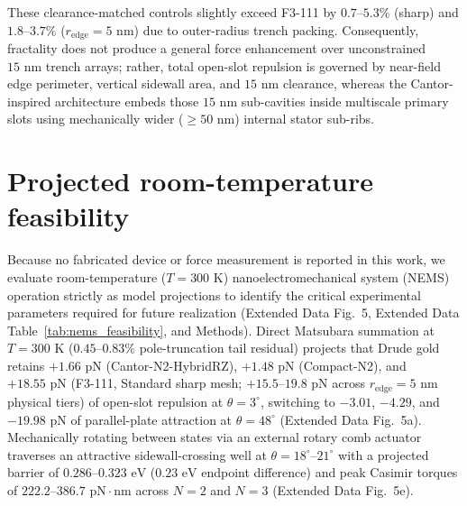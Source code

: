 \documentclass[11pt, a4paper]{article}
\begin{document}
These clearance-matched controls slightly exceed F3-111 by $0.7\text{--}5.3\%$ (sharp) and $1.8\text{--}3.7\%$ ($r_{\mathrm{edge}}=5\text{ nm}$) due to outer-radius trench packing. Consequently, fractality does not produce a general force enhancement over unconstrained $15\text{ nm}$ trench arrays; rather, total open-slot repulsion is governed by near-field edge perimeter, vertical sidewall area, and $15\text{ nm}$ clearance, whereas the Cantor-inspired architecture embeds those $15\text{ nm}$ sub-cavities inside multiscale primary slots using mechanically wider ($\ge 50\text{ nm}$) internal stator sub-ribs.

\section*{Projected room-temperature feasibility}

Because no fabricated device or force measurement is reported in this work, we evaluate room-temperature ($T = 300\text{ K}$) nanoelectromechanical system (NEMS) operation strictly as model projections to identify the critical experimental parameters required for future realization (Extended Data Fig.~5, Extended Data Table~\ref{tab:nems_feasibility}, and Methods). Direct Matsubara summation at $T = 300\text{ K}$ ($0.45\text{--}0.83\%$ pole-truncation tail residual) projects that Drude gold retains $+1.66\text{ pN}$ (Cantor-N2-HybridRZ), $+1.48\text{ pN}$ (Compact-N2), and $+18.55\text{ pN}$ (F3-111, Standard sharp mesh; $+15.5\text{--}19.8\text{ pN}$ across $r_{\mathrm{edge}}=5\text{ nm}$ physical tiers) of open-slot repulsion at $\theta=3^\circ$, switching to $-3.01$, $-4.29$, and $-19.98\text{ pN}$ of parallel-plate attraction at $\theta=48^\circ$ (Extended Data Fig.~5a). Mechanically rotating between states via an external rotary comb actuator traverses an attractive sidewall-crossing well at $\theta = 18^\circ\text{--}21^\circ$ with a projected barrier of $0.286\text{--}0.323\text{ eV}$ ($0.23\text{ eV}$ endpoint difference) and peak Casimir torques of $222.2\text{--}386.7\text{ pN}\cdot\text{nm}$ across $N=2$ and $N=3$ (Extended Data Fig.~5e).
\end{document}
